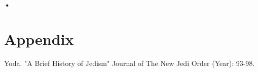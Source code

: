 
\tableofcontents
 
\newpage

\listoffigures
{} 


\listoftables 
{} 
\newpage



\newpage

\clearpage







\textbf{•}
\clearpage
\section*{Appendix}


\begin{thebibliography}{}
 Yoda. "A Brief History of Jedism" Journal of The New Jedi Order (Year): 93-98.
 \end{thebibliography} 

